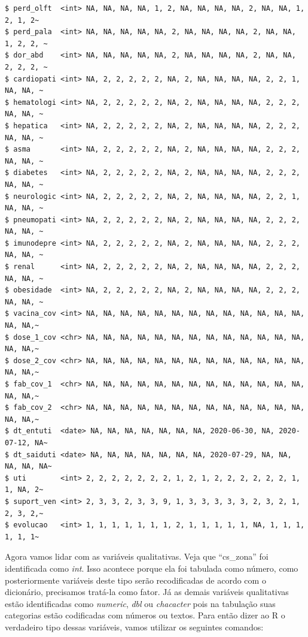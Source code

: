 \documentclass[
  letterpaper,
  DIV=11,
  numbers=noendperiod]{scrreprt}
\begin{document}
\begin{verbatim}
$ perd_olft  <int> NA, NA, NA, NA, 1, 2, NA, NA, NA, NA, 2, NA, NA, 1, 2, 1, 2~
$ perd_pala  <int> NA, NA, NA, NA, NA, 2, NA, NA, NA, NA, 2, NA, NA, 1, 2, 2, ~
$ dor_abd    <int> NA, NA, NA, NA, NA, 2, NA, NA, NA, NA, 2, NA, NA, 2, 2, 2, ~
$ cardiopati <int> NA, 2, 2, 2, 2, 2, NA, 2, NA, NA, NA, NA, 2, 2, 1, NA, NA, ~
$ hematologi <int> NA, 2, 2, 2, 2, 2, NA, 2, NA, NA, NA, NA, 2, 2, 2, NA, NA, ~
$ hepatica   <int> NA, 2, 2, 2, 2, 2, NA, 2, NA, NA, NA, NA, 2, 2, 2, NA, NA, ~
$ asma       <int> NA, 2, 2, 2, 2, 2, NA, 2, NA, NA, NA, NA, 2, 2, 2, NA, NA, ~
$ diabetes   <int> NA, 2, 2, 2, 2, 2, NA, 2, NA, NA, NA, NA, 2, 2, 2, NA, NA, ~
$ neurologic <int> NA, 2, 2, 2, 2, 2, NA, 2, NA, NA, NA, NA, 2, 2, 1, NA, NA, ~
$ pneumopati <int> NA, 2, 2, 2, 2, 2, NA, 2, NA, NA, NA, NA, 2, 2, 2, NA, NA, ~
$ imunodepre <int> NA, 2, 2, 2, 2, 2, NA, 2, NA, NA, NA, NA, 2, 2, 2, NA, NA, ~
$ renal      <int> NA, 2, 2, 2, 2, 2, NA, 2, NA, NA, NA, NA, 2, 2, 2, NA, NA, ~
$ obesidade  <int> NA, 2, 2, 2, 2, 2, NA, 2, NA, NA, NA, NA, 2, 2, 2, NA, NA, ~
$ vacina_cov <int> NA, NA, NA, NA, NA, NA, NA, NA, NA, NA, NA, NA, NA, NA, NA,~
$ dose_1_cov <chr> NA, NA, NA, NA, NA, NA, NA, NA, NA, NA, NA, NA, NA, NA, NA,~
$ dose_2_cov <chr> NA, NA, NA, NA, NA, NA, NA, NA, NA, NA, NA, NA, NA, NA, NA,~
$ fab_cov_1  <chr> NA, NA, NA, NA, NA, NA, NA, NA, NA, NA, NA, NA, NA, NA, NA,~
$ fab_cov_2  <chr> NA, NA, NA, NA, NA, NA, NA, NA, NA, NA, NA, NA, NA, NA, NA,~
$ dt_entuti  <date> NA, NA, NA, NA, NA, NA, NA, 2020-06-30, NA, 2020-07-12, NA~
$ dt_saiduti <date> NA, NA, NA, NA, NA, NA, NA, 2020-07-29, NA, NA, NA, NA, NA~
$ uti        <int> 2, 2, 2, 2, 2, 2, 2, 1, 2, 1, 2, 2, 2, 2, 2, 2, 1, 1, NA, 2~
$ suport_ven <int> 2, 3, 3, 2, 3, 3, 9, 1, 3, 3, 3, 3, 3, 2, 3, 2, 1, 2, 3, 2,~
$ evolucao   <int> 1, 1, 1, 1, 1, 1, 1, 2, 1, 1, 1, 1, 1, NA, 1, 1, 1, 1, 1, 1~
\end{verbatim}

Agora vamos lidar com as variáveis qualitativas. Veja que ``cs\_zona''
foi identificada como \emph{int}. Isso acontece porque ela foi tabulada
como número, como posteriormente variáveis deste tipo serão
recodificadas de acordo com o dicionário, precisamos tratá-la como
fator. Já as demais variáveis qualitativas estão identificadas como
\emph{numeric}, \emph{dbl} ou \emph{chacacter} pois na tabulação suas
categorias estão codificadas com números ou textos. Para então dizer ao
R o verdadeiro tipo dessas variáveis, vamos utilizar os seguintes
comandos:
\end{document}
